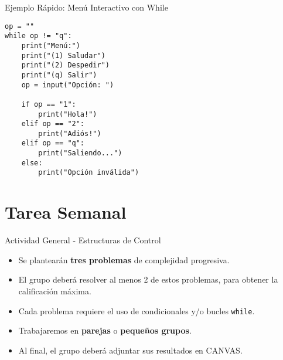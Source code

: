 \documentclass[10pt]{beamer}
\begin{document}
\begin{frame}[fragile]{Ejemplo Rápido: Menú Interactivo con While}
\begin{verbatim}
op = ""
while op != "q":
    print("Menú:")
    print("(1) Saludar")
    print("(2) Despedir")
    print("(q) Salir")
    op = input("Opción: ")

    if op == "1":
        print("Hola!")
    elif op == "2":
        print("Adiós!")
    elif op == "q":
        print("Saliendo...")
    else:
        print("Opción inválida")
\end{verbatim}
\end{frame}

\section{Tarea Semanal}

\begin{frame}{Actividad General - Estructuras de Control}
  \begin{itemize}
    \item Se plantearán \textbf{tres problemas} de complejidad progresiva.
    \item El grupo deberá resolver al menos 2 de estos problemas, para obtener la calificación máxima.
    \item Cada problema requiere el uso de condicionales y/o bucles \texttt{while}.
    \item Trabajaremos en \textbf{parejas} o \textbf{pequeños grupos}.
    \item Al final, el grupo deberá adjuntar sus resultados en CANVAS.
  \end{itemize}
\end{frame}
\end{document}
